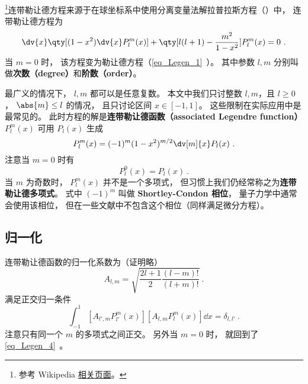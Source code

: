

\footnote{参考 Wikipedia \href{https://en.wikipedia.org/wiki/Associated_Legendre_polynomials}{相关页面}。}连带勒让德方程来源于在球坐标系中使用分离变量法解拉普拉斯方程（）中， 连带勒让德方程为
\begin{equation}
\dv{x} \qty[(1-x^2)\dv{x} P_l^m(x)] + \qty[l(l+1) - \frac{m^2}{1-x^2}]P_l^m(x) = 0~.
\end{equation}
当 $m = 0$ 时， 该方程变为勒让德方程（\autoref{eq_Legen_1}~）。 其中参数 $l, m$ 分别叫做\textbf{次数（degree）}和\textbf{阶数（order）}。

最广义的情况下， $l,m$ 都可以是任意复数。 本文中我们只讨整数 $l,m$，且 $l\geq 0$， $\abs{m} \leq l$ 的情况， 且只讨论区间 $x\in [-1,1]$。 这些限制在实际应用中是最常见的。 此时方程的解是\textbf{连带勒让德函数（associated Legendre function）} $P_l^m(x)$ 可用 $P_l(x)$ 生成
\begin{equation}\label{eq_AsLgdr_1}
P_l^m(x) = (-1)^m (1 - x^2)^{m/2} \dv[m]{x} P_l(x)~.
\end{equation}
注意当 $m = 0$ 时有
\begin{equation}
P_l^0(x) = P_l(x)~.
\end{equation}
当 $m$ 为奇数时， $P_l^m(x)$ 并不是一个多项式， 但习惯上我们仍经常称之为\textbf{连带勒让德多项式}。 式中 $(-1)^m$ 叫做 \textbf{Shortley-Condon 相位}， 量子力学中通常会使用该相位， 但在一些文献中不包含这个相位（同样满足微分方程）。

\subsection{归一化}
连带勒让德函数的归一化系数为（证明略）
\begin{equation}\label{eq_AsLgdr_3}
A_{l,m} = \sqrt{\frac{2l+1}{2}\frac{(l-m)!}{(l+m)!}}~.
\end{equation}
满足正交归一条件
\begin{equation}\label{eq_AsLgdr_4}
\int_{-1}^1 [A_{l',m} P_{l'}^{m}(x)] [A_{l,m} P_l^{m}(x)] \dd{x} = \delta_{l,l'}~.
\end{equation}
注意只有同一个 $m$ 的多项式之间正交。 另外当 $m = 0$ 时， 就回到了\autoref{eq_Legen_4}~。

